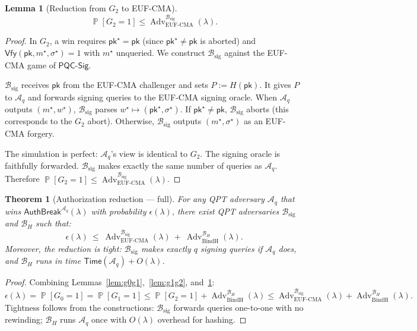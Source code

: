 \documentclass[11pt]{article}
\newtheorem{lemma}{Lemma}
\newtheorem{theorem}{Theorem}
\newcommand{\Prob}{\operatorname{\mathbb{P}}}
\newcommand{\Adv}{\operatorname{Adv}}
\newcommand{\Aq}{\mathcal{A}_q}
\newcommand{\PQC}{\mathsf{PQC}}
\begin{document}
\begin{lemma}[Reduction from $G_2$ to EUF-CMA]\label{lem:g2euf}
\[
\Prob[G_2=1] \le \Adv_{\mathrm{EUF\mbox{-}CMA}}^{\mathcal{B}_{\mathrm{sig}}}(\lambda).
\]
\end{lemma}

\begin{proof}
In $G_2$, a win requires $\mathsf{pk}^\star=\mathsf{pk}$ (since $\mathsf{pk}^\star\neq\mathsf{pk}$ is aborted) and $\mathsf{Vfy}(\mathsf{pk},m^\star,\sigma^\star)=1$ with $m^\star$ unqueried.
We construct $\mathcal{B}_{\mathrm{sig}}$ against the EUF-CMA game of $\PQC\textsf{-Sig}$.

$\mathcal{B}_{\mathrm{sig}}$ receives $\mathsf{pk}$ from the EUF-CMA challenger and sets $P:=H(\mathsf{pk})$.
It gives $P$ to $\Aq$ and forwards signing queries to the EUF-CMA signing oracle.
When $\Aq$ outputs $(m^\star,w^\star)$, $\mathcal{B}_{\mathrm{sig}}$ parses $w^\star\mapsto(\mathsf{pk}^\star,\sigma^\star)$.
If $\mathsf{pk}^\star\neq\mathsf{pk}$, $\mathcal{B}_{\mathrm{sig}}$ aborts (this corresponds to the $G_2$ abort).
Otherwise, $\mathcal{B}_{\mathrm{sig}}$ outputs $(m^\star,\sigma^\star)$ as an EUF-CMA forgery.

The simulation is perfect: $\Aq$'s view is identical to $G_2$.
The signing oracle is faithfully forwarded.
$\mathcal{B}_{\mathrm{sig}}$ makes exactly the same number of queries as $\Aq$.
Therefore $\Prob[G_2=1]\le\Adv_{\mathrm{EUF\mbox{-}CMA}}^{\mathcal{B}_{\mathrm{sig}}}(\lambda)$.
\end{proof}

\begin{theorem}[Authorization reduction --- full]\label{thm:reduction}
For any QPT adversary $\Aq$ that wins $\mathsf{AuthBreak}^{\Aq}(\lambda)$ with probability $\epsilon(\lambda)$, there exist QPT adversaries $\mathcal{B}_{\mathrm{sig}}$ and $\mathcal{B}_{H}$ such that:
\[
\epsilon(\lambda)\ \le\ \Adv_{\mathrm{EUF\mbox{-}CMA}}^{\mathcal{B}_{\mathrm{sig}}}(\lambda)\ +\ \Adv_{\mathrm{BindH}}^{\mathcal{B}_{H}}(\lambda).
\]
Moreover, the reduction is \emph{tight}: $\mathcal{B}_{\mathrm{sig}}$ makes exactly $q$ signing queries if $\Aq$ does, and $\mathcal{B}_H$ runs in time $\mathsf{Time}(\Aq)+O(\lambda)$.
\end{theorem}

\begin{proof}
Combining Lemmas~\ref{lem:g0g1},~\ref{lem:g1g2}, and~\ref{lem:g2euf}:
\[
\epsilon(\lambda) = \Prob[G_0=1] = \Prob[G_1=1] \le \Prob[G_2=1] + \Adv_{\mathrm{BindH}}^{\mathcal{B}_H}(\lambda) \le \Adv_{\mathrm{EUF\mbox{-}CMA}}^{\mathcal{B}_{\mathrm{sig}}}(\lambda) + \Adv_{\mathrm{BindH}}^{\mathcal{B}_H}(\lambda).
\]
Tightness follows from the constructions: $\mathcal{B}_{\mathrm{sig}}$ forwards queries one-to-one with no rewinding; $\mathcal{B}_H$ runs $\Aq$ once with $O(\lambda)$ overhead for hashing.
\end{proof}
\end{document}
